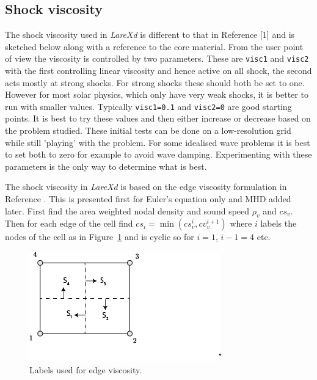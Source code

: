 \documentclass[11pt]{article}
\begin{document}
\subsection{Shock viscosity}
The shock viscosity used in {\it LareXd} is different to that in Reference [1] and is sketched below along
with a reference to the core material. From the user point of view the viscosity is controlled by two parameters.
These are \texttt{visc1} and \texttt{visc2} with the first controlling linear viscosity and hence active on all shock, the
second acts mostly at strong shocks. For strong shocks these should both be set to one. However for most solar physics,
which only have very weak shocks, it is better to run with smaller values. Typically \texttt{visc1=0.1} and \texttt{visc2=0}
are good starting points. It is best to try these values and then either increase or decrease based on the problem studied.
These initial tests can be done on a low-resolution grid while still 'playing' with the problem. For some idealised wave
problems it is best to set both to zero for example to avoid wave damping. Experimenting with these parameters is the
only way to determine what is best.

The shock viscosity in {\it LareXd} is based on the edge viscosity formulation in Reference \cite{caramana}.
This is presented first for Euler's equation only and MHD added later.
First find the area weighted nodal density and sound speed $\rho_v$ and $cs_v$. Then for 
each edge of the cell find $cs_i=\min(cs_v^i,cv_v^{i+1})$ where $i$ labels the nodes of the cell
as in Figure~\ref{fig:larexd-grid} and is cyclic so for $i=1$, $i-1=4$ etc. 

\begin{figure}
  \centering
  \includegraphics[scale=0.8]{larexd-grid.png}
  \caption{Labels used for edge viscosity.}
  \label{fig:larexd-grid}
\end{figure} 
\end{document}
